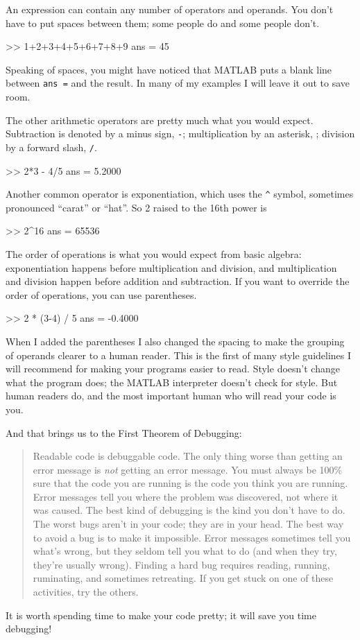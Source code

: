 \documentclass[
]{book}
\numberwithin{Answer}{chapter}
\numberwithin{Exercise}{chapter}
\newcommand{\displaythrm}[1]{%
    \ifthenelse{\equal{#1}{1}}%
        {Readable code is debuggable code.}{%
    \ifthenelse{\equal{#1}{2}}%
        {The only thing worse than getting an error message is {\em
         not} getting an error message.}{%
    \ifthenelse{\equal{#1}{3}}%
        {You must always be 100\% sure that the code you are running
         is the code you think you are running.}{%
    \ifthenelse{\equal{#1}{4}}%
        {Error messages tell you where the problem was discovered,
         not where it was caused.}{%
    \ifthenelse{\equal{#1}{5}}%
        {The best kind of debugging is the kind you don't have to do.}{%
    \ifthenelse{\equal{#1}{6}}%
        {The worst bugs aren't in your code; they are in your head.}{%
    \ifthenelse{\equal{#1}{7}}%
        {The best way to avoid a bug is to make it impossible.}{%
    \ifthenelse{\equal{#1}{8}}%
        {Error messages sometimes tell you what's wrong, but they
         seldom tell you what to do (and when they try, they're usually
         wrong).}{%
    \ifthenelse{\equal{#1}{9}}%
        {Finding a hard bug requires reading, running, ruminating,
         and sometimes retreating.  If you get stuck on one of these
         activities, try the others.}{%
    {}%
}}}}}}}}}}%
\begin{document}
An expression can contain any number of operators and operands.  You
don't have to put spaces between them; some people do and some people
don't.

\begin{code}
>> 1+2+3+4+5+6+7+8+9
ans = 45
\end{code}

Speaking of spaces, you might have noticed that MATLAB puts a blank
line between {\tt ans =} and the result.  In many of my examples I will leave
it out to save room.

The other arithmetic operators are pretty much what you would expect.
Subtraction is denoted by a minus sign, {\tt -}; multiplication by
an asterisk, {\tt *}; division by a forward slash, {\tt /}.

\begin{code}
>> 2*3 - 4/5
ans = 5.2000
\end{code}

Another common operator is exponentiation, which uses the \verb+^+
symbol, sometimes pronounced ``carat'' or ``hat''.  So 2 raised to the
16th power is

\begin{code}
>> 2^16
ans = 65536
\end{code}

The order of operations is what you would expect from basic algebra:
exponentiation happens before multiplication and division, and multiplication and division happen before addition and subtraction.
If you want to override the order of operations, you can use parentheses.


\begin{code}
>> 2 * (3-4) / 5
ans = -0.4000
\end{code}

When I added the parentheses I also changed the spacing to make the
grouping of operands clearer to a human reader.  This is the first
of many style guidelines I will recommend for making your programs
easier to read.  Style doesn't change what the program does; the MATLAB
interpreter doesn't check for style.  But human readers do, and the
most important human who will read your code is you.

And that brings us to the First Theorem of Debugging:

\begin{quote}
\displaythrm{1}
\end{quote}

It is worth spending time to make your code pretty; it will save
you time debugging!
\end{document}

